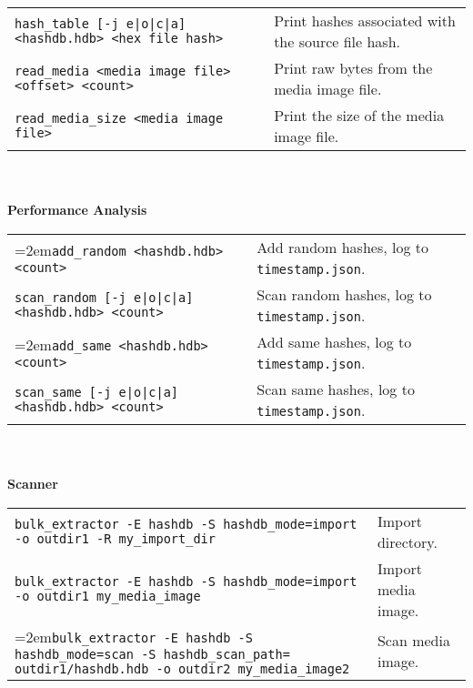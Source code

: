 \begin{footnotesize}
\begin{tabular}{p{3.6 in} p{3.0 in}}
\texttt{hash\_table [-j e|o|c|a] <hashdb.hdb> <hex file hash>} & Print hashes associated with the source file hash.\\
\texttt{read\_media <media image file> <offset> <count>} & Print raw bytes from the media image file.\\
\texttt{read\_media\_size <media image file>} & Print the size of the media image file.\\
\end{tabular}
\\
\\
\textbf{Performance Analysis}\\
\begin{tabular}{p{3.6 in} p{4 in}}
\hangindent=2em\texttt{add\_random <hashdb.hdb> <count>} & Add random hashes, log to \texttt{timestamp.json}.\\
\texttt{scan\_random [-j e|o|c|a] <hashdb.hdb> <count>} & Scan random hashes, log to \texttt{timestamp.json}.\\
\hangindent=2em\texttt{add\_same <hashdb.hdb> <count>} & Add same hashes, log to \texttt{timestamp.json}.\\
\texttt{scan\_same [-j e|o|c|a] <hashdb.hdb> <count>} & Scan same hashes, log to \texttt{timestamp.json}.\\
\end{tabular}
\\
\\
\textbf{\bulk Scanner}\\
\begin{tabular}{p{5.6 in} p{2 in}}
\texttt{bulk\_extractor -E hashdb -S hashdb\_mode=import -o outdir1 -R my\_import\_dir} & Import directory.\\
\texttt{bulk\_extractor -E hashdb -S hashdb\_mode=import -o outdir1 my\_media\_image} & Import media image.\\
\hangindent=2em\texttt{bulk\_extractor -E hashdb -S hashdb\_mode=scan -S hashdb\_scan\_path= outdir1/hashdb.hdb -o outdir2 my\_media\_image2} & Scan media image.\\
\end{tabular}
\end{footnotesize}

